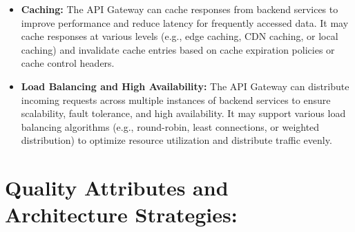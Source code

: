 \documentclass{article}
\begin{document}
\begin{itemize}
    \item \textbf{Caching:} The API Gateway can cache responses from backend services to improve performance and reduce latency for frequently accessed data. It may cache responses at various levels (e.g., edge caching, CDN caching, or local caching) and invalidate cache entries based on cache expiration policies or cache control headers.
    \item \textbf{Load Balancing and High Availability:} The API Gateway can distribute incoming requests across multiple instances of backend services to ensure scalability, fault tolerance, and high availability. It may support various load balancing algorithms (e.g., round-robin, least connections, or weighted distribution) to optimize resource utilization and distribute traffic evenly.
\end{itemize}

\section*{Quality Attributes and Architecture Strategies:}
\end{document}
